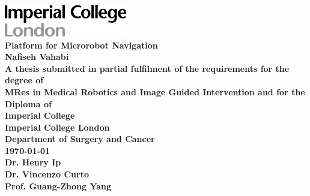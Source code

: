 \documentclass[12pt,a4paper,titlepage]{report}
\begin{document}

\begin{titlepage}
\vspace*{\fill} %
\begin{center}




\includegraphics[width=0.4\textwidth]{logo.jpg}\\[2.4cm] 




\textbf{\LARGE Platform for Microrobot Navigation} \\ [1.5cm]


\textbf{\LARGE Nafiseh Vahabi} \\ [1.3cm]


\textbf{\normalsize A thesis submitted in partial fulfilment of the requirements for the degree of } \\ [0.2cm]
\textbf{\normalsize MRes in Medical Robotics and Image Guided Intervention and for the Diploma of}\\ [0.2cm]
\textbf{\normalsize  Imperial College}\\ [2.3cm]


\textbf{\LARGE Imperial College London} \\ [0.6cm]
\textbf{\large Department of Surgery and Cancer} \\ [1.90cm]

\UKvardate
\textbf{\large \today} \\ [1.9cm]

\textbf{\large  Dr. Henry Ip} \\ [0.3cm]
\textbf{\large  Dr. Vincenzo Curto} \\ [0.3cm]
\textbf{\large Prof. Guang-Zhong Yang} \\ [1.5cm]




\end{center}
\vspace*{\fill}
\end{titlepage}
\end{document}
